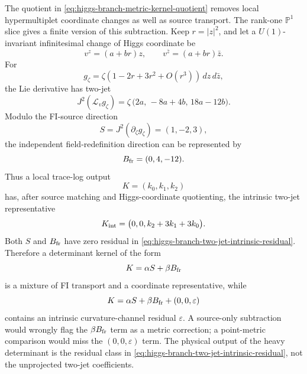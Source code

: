 \begin{example}
\label{ex:higgs-branch-field-redefinition-two-jet-quotient}
The quotient in \eqref{eq:higgs-branch-metric-kernel-quotient} removes local
hypermultiplet coordinate changes as well as source transport.  The rank-one
\(\mathbb P^1\) slice gives a finite version of this subtraction.  Keep
\(r=|z|^2\), and let a \(U(1)\)-invariant infinitesimal change of Higgs
coordinate be
\[
  v^z=(a+br)z,\qquad v^{\bar z}=(a+br)\bar z .
\]
For
\[
  g_\zeta=\zeta(1-2r+3r^2+O(r^3))\,dz\,d\bar z,
\]
the Lie derivative has two-jet
\begin{equation}
  J^2(\mathcal L_v g_\zeta)
  =
  \zeta\,\bigl(2a,\,-8a+4b,\,18a-12b\bigr).
  \label{eq:higgs-branch-field-redefinition-two-jet}
\end{equation}
Modulo the FI-source direction
\[
  S=J^2(\partial_\zeta g_\zeta)=(1,-2,3),
\]
the independent field-redefinition direction can be represented by
\[
  B_{\rm fr}=(0,4,-12).
\]
Thus a local trace-log output
\[
  K=(k_0,k_1,k_2)
\]
has, after source matching and Higgs-coordinate quotienting, the intrinsic
two-jet representative
\begin{equation}
  K_{\rm int}
  =
  \bigl(0,0,k_2+3k_1+3k_0\bigr).
  \label{eq:higgs-branch-two-jet-intrinsic-residual}
\end{equation}
Both \(S\) and \(B_{\rm fr}\) have zero residual in
\eqref{eq:higgs-branch-two-jet-intrinsic-residual}.  Therefore a determinant
kernel of the form
\[
  K=\alpha S+\beta B_{\rm fr}
\]
is a mixture of FI transport and a coordinate representative, while
\[
  K=\alpha S+\beta B_{\rm fr}+(0,0,\varepsilon)
\]
contains an intrinsic curvature-channel residual \(\varepsilon\).  A
source-only subtraction would wrongly flag the \(\beta B_{\rm fr}\) term as a
metric correction; a point-metric comparison would miss the
\((0,0,\varepsilon)\) term.  The physical output of the heavy determinant is
the residual class in
\eqref{eq:higgs-branch-two-jet-intrinsic-residual}, not the unprojected
two-jet coefficients.
\end{example}

